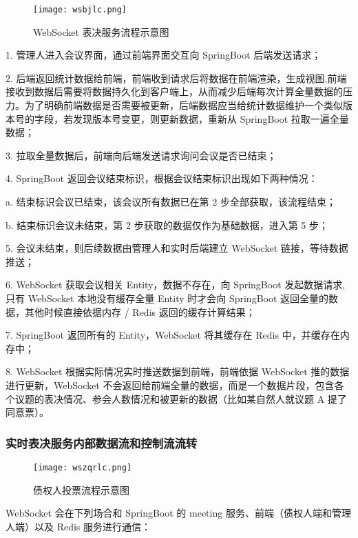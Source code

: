 \begin{figure}[!htp]
    \centering
    \texttt{[image: wsbjlc.png]}
    \caption{WebSocket 表决服务流程示意图}
    \label{fig:wsbjlc}
  \end{figure}

  1. 管理人进入会议界面，通过前端界面交互向 SpringBoot 后端发送请求；

 2. 后端返回统计数据给前端，前端收到请求后将数据在前端渲染，生成视图,前端接收到数据后需要将数据持久化到客户端上，从而减少后端每次计算全量数据的压力。为了明确前端数据是否需要被更新，后端数据应当给统计数据维护一个类似版本号的字段，若发现版本号变更，则更新数据，重新从 SpringBoot 拉取一遍全量数据；

3. 拉取全量数据后，前端向后端发送请求询问会议是否已结束；

4. SpringBoot 返回会议结束标识，根据会议结束标识出现如下两种情况：

  \quad{}\quad{}a. 结束标识会议已结束，该会议所有数据已在第 2 步全部获取，该流程结束；
  
  \quad{}\quad{}b. 结束标识会议未结束，第 2 步获取的数据仅作为基础数据，进入第 5 步；
  
5. 会议未结束，则后续数据由管理人和实时后端建立 WebSocket 链接，等待数据推送；
  
6. WebSocket 获取会议相关 Entity，数据不存在，向 SpringBoot 发起数据请求,只有 WebSocket 本地没有缓存全量 Entity 时才会向 SpringBoot 返回全量的数据，其他时候直接依据内存 / Redis 返回的缓存计算结果；
  
7. SpringBoot 返回所有的 Entity，WebSocket 将其缓存在 Redis 中，并缓存在内存中；
  
8. WebSocket 根据实际情况实时推送数据到前端，前端依据 WebSocket 推的数据进行更新，WebSocket 不会返回给前端全量的数据，而是一个数据片段，包含各个议题的表决情况、参会人数情况和被更新的数据（比如某自然人就议题 A 提了同意票）。

  \subsubsection{实时表决服务内部数据流和控制流流转}
  \begin{figure}[!htp]
    \centering
    \texttt{[image: wszqrlc.png]}
    \caption{债权人投票流程示意图}
    \label{fig:wszqrlc}
  \end{figure}

  WebSocket 会在下列场合和 SpringBoot 的 meeting 服务、前端（债权人端和管理人端）以及 Redis 服务进行通信：

